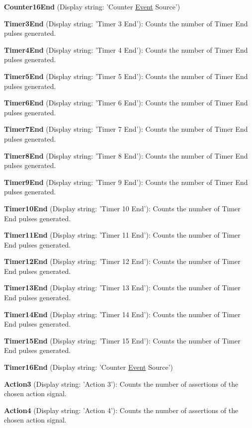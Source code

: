 \begin{DoxyItemize}
\item {\bfseries Counter16\+End} (Display string\+: 'Counter \hyperlink{classmv_i_m_p_a_c_t_1_1acquire_1_1_event}{Event} Source')
\item {\bfseries Timer3\+End} (Display string\+: 'Timer 3 End')\+: Counts the number of Timer End pulses generated.
\item {\bfseries Timer4\+End} (Display string\+: 'Timer 4 End')\+: Counts the number of Timer End pulses generated.
\item {\bfseries Timer5\+End} (Display string\+: 'Timer 5 End')\+: Counts the number of Timer End pulses generated.
\item {\bfseries Timer6\+End} (Display string\+: 'Timer 6 End')\+: Counts the number of Timer End pulses generated.
\item {\bfseries Timer7\+End} (Display string\+: 'Timer 7 End')\+: Counts the number of Timer End pulses generated.
\item {\bfseries Timer8\+End} (Display string\+: 'Timer 8 End')\+: Counts the number of Timer End pulses generated.
\item {\bfseries Timer9\+End} (Display string\+: 'Timer 9 End')\+: Counts the number of Timer End pulses generated.
\item {\bfseries Timer10\+End} (Display string\+: 'Timer 10 End')\+: Counts the number of Timer End pulses generated.
\item {\bfseries Timer11\+End} (Display string\+: 'Timer 11 End')\+: Counts the number of Timer End pulses generated.
\item {\bfseries Timer12\+End} (Display string\+: 'Timer 12 End')\+: Counts the number of Timer End pulses generated.
\item {\bfseries Timer13\+End} (Display string\+: 'Timer 13 End')\+: Counts the number of Timer End pulses generated.
\item {\bfseries Timer14\+End} (Display string\+: 'Timer 14 End')\+: Counts the number of Timer End pulses generated.
\item {\bfseries Timer15\+End} (Display string\+: 'Timer 15 End')\+: Counts the number of Timer End pulses generated.
\item {\bfseries Timer16\+End} (Display string\+: 'Counter \hyperlink{classmv_i_m_p_a_c_t_1_1acquire_1_1_event}{Event} Source')
\item {\bfseries Action3} (Display string\+: 'Action 3')\+: Counts the number of assertions of the chosen action signal.
\item {\bfseries Action4} (Display string\+: 'Action 4')\+: Counts the number of assertions of the chosen action signal.

\end{DoxyItemize}
